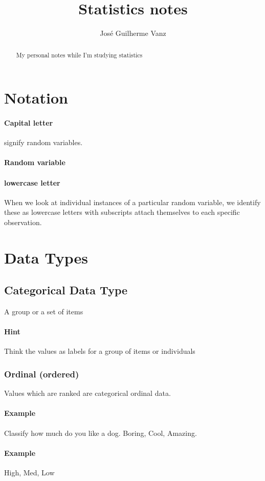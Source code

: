 \documentclass[]{article}
\title{Statistics notes}
\author{José Guilherme Vanz}
\begin{document}
\maketitle

\begin{abstract}
My personal notes while I'm studying statistics
\end{abstract}

\section{Notation}
\paragraph{Capital letter} signify random variables.
\paragraph{Random variable}
\paragraph{lowercase letter}When we look at individual instances of a particular random variable, we identify these as lowercase letters with subscripts attach themselves to each specific observation. 

\section{Data Types}

\subsection{Categorical Data Type}
A group or a set of items
\paragraph{Hint} Think the values as labels for a group of items or individuals
\subsubsection{Ordinal (ordered)}
Values which are ranked are categorical ordinal data. 
\paragraph{Example} Classify how much do you like a dog. Boring, Cool, Amazing. 
\paragraph{Example} High, Med, Low
\end{document}
